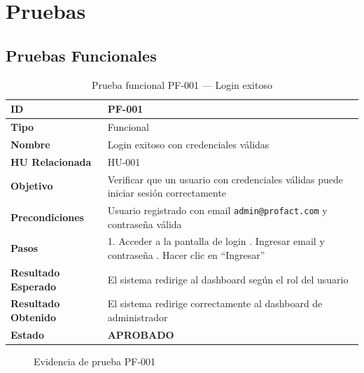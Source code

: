 \documentclass[12pt, letterpaper]{report}
\begin{document}
\section{Pruebas}

\subsection{Pruebas Funcionales}

\begin{table}[H]
\centering
\caption{Prueba funcional PF-001 --- Login exitoso}
\renewcommand{\arraystretch}{1.3}
\begin{tabularx}{\textwidth}{|l|X|}
\hline
\textbf{ID} & PF-001 \\ \hline
\textbf{Tipo} & Funcional \\ \hline
\textbf{Nombre} & Login exitoso con credenciales válidas \\ \hline
\textbf{HU Relacionada} & HU-001 \\ \hline
\textbf{Objetivo} & Verificar que un usuario con credenciales válidas puede iniciar sesión correctamente \\ \hline
\textbf{Precondiciones} & Usuario registrado con email \texttt{admin@profact.com} y contraseña válida \\ \hline
\textbf{Pasos} & 1. Acceder a la pantalla de login \newline 2. Ingresar email y contraseña \newline 3. Hacer clic en ``Ingresar'' \\ \hline
\textbf{Resultado Esperado} & El sistema redirige al dashboard según el rol del usuario \\ \hline
\textbf{Resultado Obtenido} & El sistema redirige correctamente al dashboard de administrador \\ \hline
\textbf{Estado} & \textbf{APROBADO} \\ \hline
\end{tabularx}
\end{table}

\begin{figure}[H]
\centering
{}
\caption{Evidencia de prueba PF-001}
\label{fig:pf001}
\end{figure}
\end{document}
